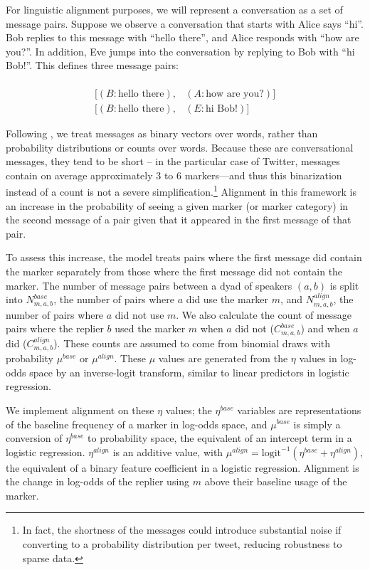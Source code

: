 \documentclass{acm_proc_article-sp}
\begin{document}
For linguistic alignment purposes, we will represent a conversation as a set of message pairs. Suppose we observe a conversation that starts with  Alice says ``hi''. Bob replies to this message with ``hello there'', and Alice responds with ``how are you?''. In addition, Eve jumps into the conversation by replying to Bob with ``hi Bob!''.  This defines three message pairs:

\begin{align*}
[(A, \textrm{hi}), & (B: \textrm{hello there})] \\
[(B: \textrm{hello there}), & (A: \textrm{how are you?})] \\
[(B: \textrm{hello there}), & (E: \textrm{hi Bob}!)] 
\end{align*}

Following \cite{DNMGamonDumais2011}, we treat messages as binary vectors over words, rather than probability distributions or counts over words.  Because these are conversational messages, they tend to be short -- in the particular case of Twitter, messages contain on average approximately 3 to 6 markers---and thus this binarization instead of a count is not a severe simplification.\footnote{In fact, the shortness of the messages could introduce substantial noise if converting to a probability distribution per tweet, reducing robustness to sparse data.}  Alignment in this framework is an increase in the probability of seeing a given marker (or marker category) in the second message of a pair given that it appeared in the first message of that pair.

To assess this increase, the model treats pairs where the first message did contain the marker separately from those where the first message did not contain the marker.  The number of message pairs between a dyad of speakers $(a,b)$ is split into $N^{base}_{m,a,b}$, the number of pairs where $a$ did use the marker $m$, and $N^{align}_{m,a,b}$, the number of pairs where $a$ did not use $m$.  We also calculate the count of message pairs where the replier $b$ used the marker $m$ when $a$ did not ($C^{base}_{m,a,b}$) and when $a$ did ($C^{align}_{m,a,b}$).   These counts are assumed to come from binomial draws with probability $\mu^{base}$ or $\mu^{align}$.  These $\mu$ values are generated from the $\eta$ values in log-odds space by an inverse-logit transform, similar to linear predictors in logistic regression.

We implement alignment on these $\eta$ values; the $\eta^{base}$ variables are representations of the baseline frequency of a marker in log-odds space, and $\mu^{base}$ is simply a conversion of $\eta^{base}$ to probability space, the equivalent of an intercept term in a logistic regression. $\eta^{align}$ is an additive value, with $\mu^{align} = \textrm{logit}^{-1}(\eta^{base}+\eta^{align})$, the equivalent of a binary feature coefficient in a logistic regression.  Alignment is the change in log-odds of the replier using $m$ above their baseline usage of the marker. %
\end{document}
